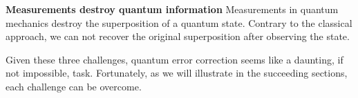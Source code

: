 

\vspace{0.5em}
\noindent
\textbf{Measurements destroy quantum information} Measurements in quantum mechanics destroy the superposition of a quantum state. Contrary to the classical approach, we can not recover the original superposition after observing the state.

\smallskip
\noindent
Given these three challenges, quantum error correction seems like a daunting, if not impossible, task. Fortunately, as we will illustrate in the succeeding sections, each challenge can be overcome.